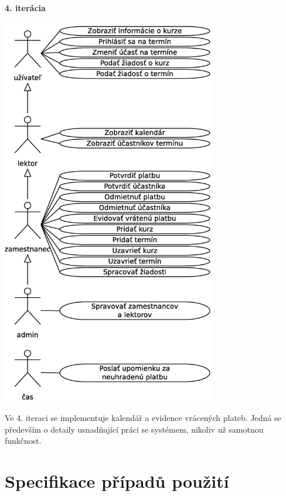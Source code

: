 \documentclass[12pt,a4paper,titlepage,final]{report}
\begin{document}
	\subsubsection{4. iterácia}
		\begin{center}
			\captionsetup{type=figure}
			\includegraphics[height=17cm]{img/use_case.eps}
		\end{center}
		
Ve 4. iteraci se implementuje kalendář a evidence vrácených plateb. Jedná se především o detaily usnadňující práci se systémem, nikoliv už samotnou funkčnost.









\chapter{Specifikace případů použití}
\end{document}
